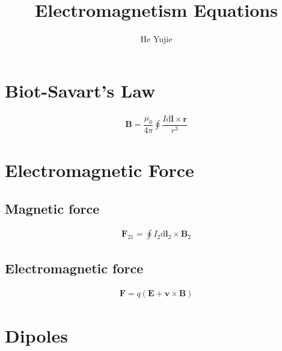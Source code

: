 \documentclass[10pt, a4paper]{article}
\title{Electromagnetism Equations}
\author{He Yujie}
\begin{document}
\maketitle

\section{Biot-Savart's Law}

	\begin{align}
		\bm{B} = \dfrac{\mu_0}{4\pi} \oint \dfrac{I \mathrm{d} \bm{l} \times \bm{r}}{r^3}
	\end{align}

\section{Electromagnetic Force}

\begin{multicols}{2}

\subsection{Magnetic force}

	\begin{align}
		\bm{F}_\text{21} = \oint I_\text{2} \mathrm{d} \bm{l}_\text{2} \times \bm{B}_\text{2}
	\end{align}

\subsection{Electromagnetic force}

	\begin{align}
		\bm{F} = q \left(\bm{E} + \bm{v} \times \bm{B}\right)
	\end{align}

\end{multicols}

\section{Dipoles}
\end{document}
